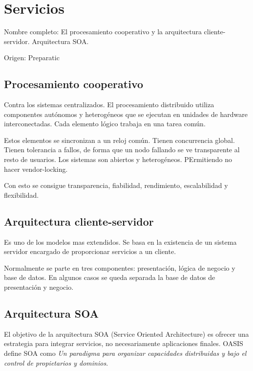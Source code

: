 \setcounter{section}{57} %
\section{Servicios}

Nombre completo: El procesamiento cooperativo y la arquitectura cliente-servidor. Arquitectura SOA.

Origen: Preparatic

\localtableofcontents

\subsection{Procesamiento cooperativo}

Contra los sistemas centralizados. El procesamiento distribuido utiliza componentes autónomos y heterogéneos que se ejecutan en unidades de hardware interconectadas. Cada elemento lógico trabaja en una tarea común.

Estos elementos se sincronizan a un reloj común. Tienen concurrencia global. Tienen tolerancia a fallos, de forma que un nodo fallando se ve transparente al resto de usuarios. Los sistemas son abiertos y heterogéneos. PErmitiendo no hacer vendor-locking.

Con esto se consigue transparencia, fiabilidad, rendimiento, escalabilidad y flexibilidad.

\subsection{Arquitectura cliente-servidor}

Es uno de los modelos mas extendidos. Se basa en la existencia de un sistema servidor encargado de proporcionar servicios a un cliente.

Normalmente se parte en tres componentes: presentación, lógica de negocio y base de datos. En algunos casos se queda separada la base de datos de presentación y negocio.

\subsection{Arquitectura SOA}

El objetivo de la arquitectura SOA (Service Oriented Architecture) es ofrecer una estrategia para integrar servicios, no necesariamente aplicaciones finales. OASIS define SOA como \textit{Un paradigma para organizar capacidades distribuidas y bajo el control de propietarios y dominios}.

